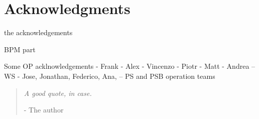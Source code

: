 \chapter*{Acknowledgments}

the acknowledgements

BPM part


Some OP acklnowledgements
- Frank
- Alex
- Vincenzo
- Piotr
- Matt
- Andrea
-- WS
  - Jose, Jonathan, Federico, Ana,
-- PS and PSB operation teams


\blockquote{
\emph{A good quote, in case.}
\begin{flushright}
- The author
\end{flushright}
}%
